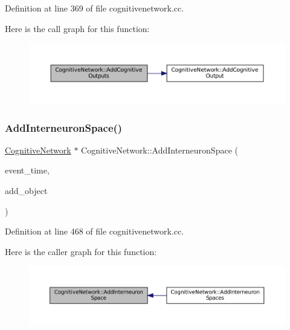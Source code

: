 Definition at line 369 of file cognitivenetwork.\+cc.

Here is the call graph for this function\+:\nopagebreak
\begin{figure}[H]
\begin{center}
\leavevmode
\includegraphics[width=350pt]{class_cognitive_network_a6299433811b76f0ccb97cf69fe9bfb66_cgraph}
\end{center}
\end{figure}
\mbox{\label{class_cognitive_network_ac6a7e01f097d0cb6434eb8fa7640c214}} 
\subsubsection{\texorpdfstring{Add\+Interneuron\+Space()}{AddInterneuronSpace()}}
{\footnotesize\ttfamily \mbox{\hyperlink{class_cognitive_network}{Cognitive\+Network}} $\ast$ Cognitive\+Network\+::\+Add\+Interneuron\+Space (\begin{DoxyParamCaption}\item[{std\+::chrono\+::time\+\_\+point$<$ \mbox{\hyperlink{universe_8h_a0ef8d951d1ca5ab3cfaf7ab4c7a6fd80}{Clock}} $>$}]{event\+\_\+time,  }\item[{\mbox{\hyperlink{class_cognitive_network}{Cognitive\+Network}} $\ast$}]{add\+\_\+object }\end{DoxyParamCaption})}



Definition at line 468 of file cognitivenetwork.\+cc.

Here is the caller graph for this function\+:\nopagebreak
\begin{figure}[H]
\begin{center}
\leavevmode
\includegraphics[width=350pt]{class_cognitive_network_ac6a7e01f097d0cb6434eb8fa7640c214_icgraph}
\end{center}
\end{figure}
\mbox{\label{class_cognitive_network_aeafe16b9f44ae1316c072a85e726ee83}} 
